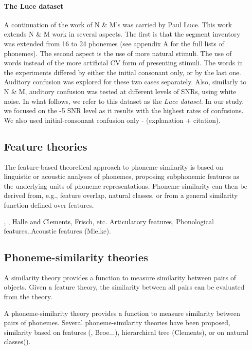 \paragraph{The Luce dataset} A continuation of the work of N \& M's was carried by Paul Luce. This work extends N \& M work in several aspects. The first is that the segment inventory was extended from 16 to 24 phonemes (see appendix A for the full lists of phonemes). The second aspect is the use of more natural stimuli. The use of words instead of the more artificial CV form of presenting stimuli. The words in the experiments differed by either the initial consonant only, or by the last one. Auditory confusion was explored for these two cases separately. Also, similarly to N \& M, auditory confusion was tested at different levels of SNRs, using white noise. In what follows, we refer to this dataset as the \textit{Luce dataset}. In our study, we focused on the -5 SNR level as it results with the highest rates of confusions. We also used initial-consonant confusion only - (explanation + citation). 

\subsection{Feature theories}
The feature-based theoretical approach to phoneme similarity is based on linguistic or acoustic analyses of phonemes, proposing subphonemic features as the underlying units of phoneme representations. Phoneme similarity can then be derived from, e.g., feature overlap, natural classes, or from a general similarity function defined over features. 

\cite{Clements1985}, \cite{ChomskyHalle1968}, Halle and Clements, Frisch, etc. Articulatory features,  Phonological features..Acoustic features (Mielke).

\subsection{Phoneme-similarity theories}
A similarity theory provides a function to measure similarity between pairs of objects. Given a feature theory, the similarity between all pairs can be evaluated from the theory. \cite{Tversky1977}

A phoneme-similarity theory provides a function to measure similarity between pairs of phonemes. Several phoneme-similarity theories have been proposed, similarity based on features (\cite{ChomskyHalle1968}, Broe...), hierarchical tree (Clements), or on natural classes().


